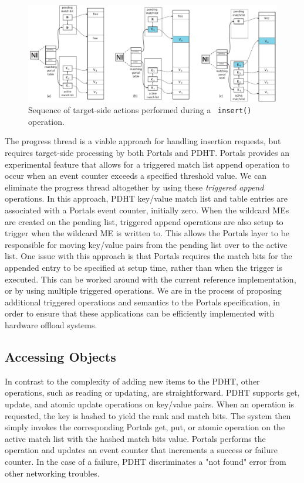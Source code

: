 \begin{figure}
  \centering
  \includegraphics[width=0.85\linewidth]{figs/put}
  \caption{Sequence of target-side actions performed during a \pdht~{\tt insert()} operation.}
  \label{fig:put}
\end{figure}

The progress thread is a viable approach for handling insertion requests, but
requires target-side processing by both Portals and PDHT. Portals provides an
experimental feature that allows for a triggered match list append operation to
occur when an event counter exceeds a specified threshold value. We can
eliminate the progress thread altogether by using these {\em triggered append}
operations. In this approach, PDHT key/value match list and table entries are
associated with a Portals event counter, initially zero.  When the wildcard MEs
are created on the pending list, triggered append operations are also setup to
trigger when the wildcard ME is written to. This allows the Portals layer to be
responsible for moving key/value pairs from the pending list over to the active
list. One issue with this approach is that Portals requires the match bits for
the appended entry to be specified at setup time, rather than when the trigger
is executed. This can be worked around with the current reference
implementation, or by using multiple triggered operations. We are in the
process of proposing additional triggered operations and semantics to the Portals
specification, in order to ensure that these applications can be efficiently
implemented with hardware offload systems.

\subsection{Accessing Objects}

In contrast to the complexity of adding new items to the PDHT, other
operations, such as reading or updating, are straightforward. PDHT supports
get, update, and atomic update operations on key/value pairs.  When an
operation is requested, the key is hashed to yield the rank and match bits. The
system then simply invokes the corresponding Portals get, put, or atomic
operation on the active match list with the hashed match bits value. Portals
performs the operation and updates an event counter that increments a success
or failure counter. In the case of a failure, PDHT discriminates a "not found"
error from other networking troubles.

